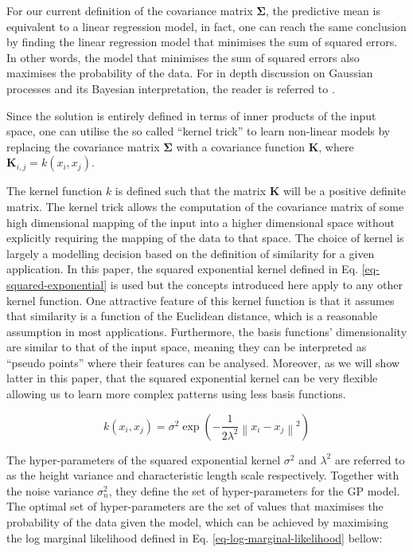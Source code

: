 \documentclass[useAMS,usenatbib,fleqn]{mn2e}
\newcommand{\bm}[1]{\mathbf{#1} }
\begin{document}
For our current definition of the covariance matrix $\bm{\Sigma}$, the predictive mean is equivalent to a linear regression model, in fact, one can reach the same conclusion by finding the linear regression model that minimises the sum of squared errors. In other words, the model that minimises the sum of squared errors also maximises the probability of the data. For in depth discussion on Gaussian processes and its Bayesian interpretation, the reader is referred to \citep{rasmussen2006gaussian}.

Since the solution is entirely defined in terms of inner products of the input space, one can utilise the so called ``kernel trick'' to learn non-linear models by replacing the covariance matrix $\bm{\Sigma}$ with a covariance function $\bm{K}$, where $\bm{K}_{i,j} = k(x_{i},x_{j})$.

The kernel function $k$ is defined such that the matrix $\bm{K}$ will be a positive definite matrix. The kernel trick allows the computation of the covariance matrix of some high dimensional mapping of the input into a higher dimensional space without explicitly requiring the mapping of the data to that space. The choice of kernel is largely a modelling decision based on the definition of similarity for a given application. In this paper, the squared exponential kernel defined in  Eq. \eqref{eq-squared-exponential} is used but the concepts introduced here apply to any other kernel function. One attractive feature of this kernel function is that it assumes that similarity is a function of the Euclidean distance, which is a reasonable assumption in most applications. Furthermore, the basis functions' dimensionality are similar to that of the input space, meaning they can be interpreted as ``pseudo points'' where their features can be analysed. Moreover, as we will show latter in this paper, that the squared exponential kernel can be very flexible allowing us to learn more complex patterns using less basis functions.

\begin{equation}
\label{eq-squared-exponential}
k(x_{i},x_{j}) = \sigma^{2} \exp \left ( -\frac{1} {2\lambda^{2}} \left \|x_{i}-x_{j}\right\|^{2}\right )
\end{equation}

The hyper-parameters of the squared exponential kernel $\sigma^{2}$ and $\lambda^{2}$ are referred to as the height variance and characteristic length scale respectively. Together with the noise variance $\sigma_{n}^{2}$, they define the set of hyper-parameters for the GP model. The optimal set of hyper-parameters are the set of values that maximises the probability of the data given the model, which can be achieved by maximising the log marginal likelihood defined in  Eq. \eqref{eq-log-marginal-likelihood}  bellow:
\end{document}
